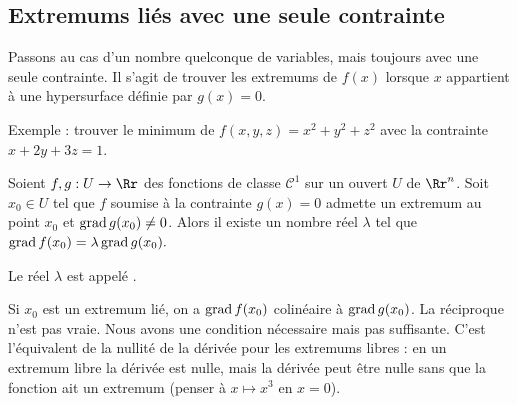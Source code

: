 \documentclass[11pt, class=report,crop=false]{standalone}
\begin{document}
\subsection{Extremums liés avec une seule contrainte}

Passons au cas d'un nombre quelconque de variables, mais toujours avec une seule contrainte.
Il s'agit de trouver les extremums de $f(x)$ lorsque $x$ appartient à une hypersurface définie par $g(x) = 0$.

Exemple : trouver le minimum de $f(x,y,z) = x^2 + y^2 + z^2$ avec la contrainte $x + 2y +3z = 1$.

\begin{theoreme}
Soient $f,g: U \to \Rr$ des fonctions de classe $\mathcal{C}^1$ sur un ouvert $U$ de $\Rr^n$.
Soit $x_0 \in U$ tel que $f$ soumise à la contrainte $g(x)=0$ admette un extremum au point $x_0$ et $\operatorname{grad} g(x_0) \neq 0$.
Alors il existe un nombre réel $\lambda$ tel que $\operatorname{grad} f(x_0) = \lambda \operatorname{grad} g(x_0).$
\end{theoreme}

Le réel $\lambda$ est appelé .

\begin{remarque*}
Si $x_0$ est un extremum lié, on a $\operatorname{grad} f(x_0)$ colinéaire à $\operatorname{grad} g(x_0)$.
La réciproque n'est pas vraie. Nous avons une condition nécessaire mais pas suffisante. C'est l'équivalent de la nullité de la dérivée pour les extremums libres : en un extremum libre la dérivée est nulle, mais la dérivée peut être nulle sans que la fonction ait un extremum (penser à $x\mapsto x^3$ en $x=0$).  
\end{remarque*}
\end{document}
